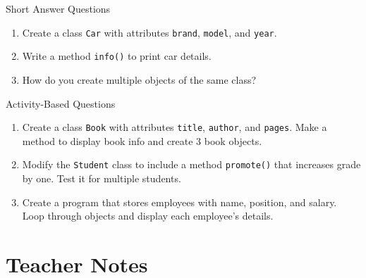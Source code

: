 \begin{exercise}{Short Answer Questions}
\begin{enumerate}
    \item Create a class \texttt{Car} with attributes \texttt{brand}, \texttt{model}, and \texttt{year}.  
    \item Write a method \texttt{info()} to print car details.  
    \item How do you create multiple objects of the same class?  
\end{enumerate}
\end{exercise}

\begin{exercise}{Activity-Based Questions}
\begin{enumerate}
    \item Create a class \texttt{Book} with attributes \texttt{title}, \texttt{author}, and \texttt{pages}. Make a method to display book info and create 3 book objects.  
    \item Modify the \texttt{Student} class to include a method \texttt{promote()} that increases grade by one. Test it for multiple students.  
    \item Create a program that stores employees with name, position, and salary. Loop through objects and display each employee’s details.  
\end{enumerate}
\end{exercise}

\section{Teacher Notes}


